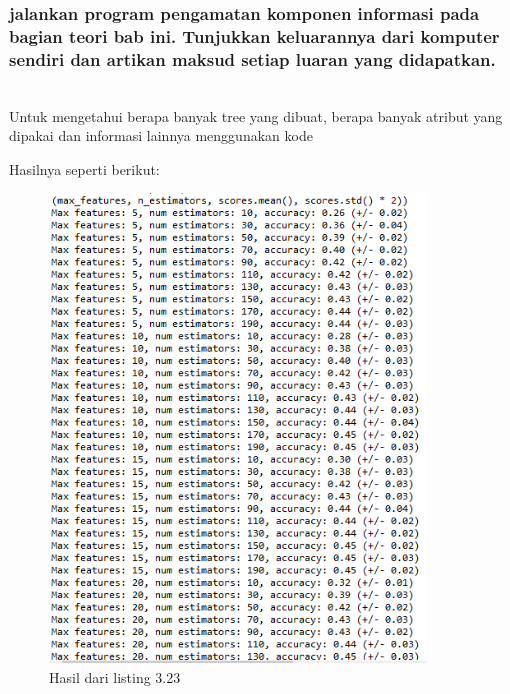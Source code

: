 \subsubsection{jalankan program pengamatan komponen informasi pada bagian teori bab ini. Tunjukkan keluarannya dari komputer sendiri dan artikan maksud setiap luaran yang didapatkan.}
\hfill\\
Untuk mengetahui berapa banyak tree yang dibuat, berapa banyak atribut yang dipakai dan informasi lainnya menggunakan kode

Hasilnya seperti berikut:
\begin{figure}[H]
	\centering
	\includegraphics[width=10cm]{figures/1174075/3/32.png}
	\caption{Hasil dari listing 3.23}
\end{figure}
